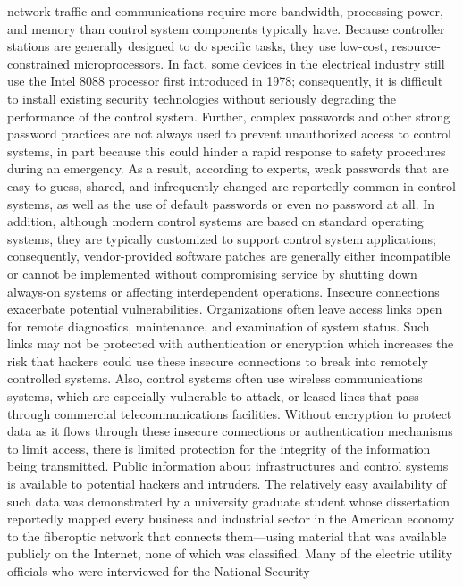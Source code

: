 \documentclass{article}
\begin{document}
network traffic and communications require more bandwidth, processing
power, and memory than control system components typically have. Because
controller stations are generally designed to do specific tasks, they
use low-cost, resource-constrained microprocessors. In fact, some
devices in the electrical industry still use the Intel 8088 processor
first introduced in 1978; consequently, it is difficult to install
existing security technologies without seriously degrading the
performance of the control system. Further, complex passwords and other
strong password practices are not always used to prevent unauthorized
access to control systems, in part because this could hinder a rapid
response to safety procedures during an emergency. As a result,
according to experts, weak passwords that are easy to guess, shared, and
infrequently changed are reportedly common in control systems, as well
as the use of default passwords or even no password at all. In addition,
although modern control systems are based on standard operating systems,
they are typically customized to support control system applications;
consequently, vendor-provided software patches are generally either
incompatible or cannot be implemented without compromising service by
shutting down always-on systems or affecting interdependent operations.
Insecure connections exacerbate potential vulnerabilities. Organizations
often leave access links open for remote diagnostics, maintenance, and
examination of system status. Such links may not be protected with
authentication or encryption which increases the risk that hackers could
use these insecure connections to break into remotely controlled
systems. Also, control systems often use wireless communications
systems, which are especially vulnerable to attack, or leased lines that
pass through commercial telecommunications facilities. Without
encryption to protect data as it flows through these insecure
connections or authentication mechanisms to limit access, there is
limited protection for the integrity of the information being
transmitted. Public information about infrastructures and control
systems is available to potential hackers and intruders. The relatively
easy availability of such data was demonstrated by a university graduate
student whose dissertation reportedly mapped every business and
industrial sector in the American economy to the fiberoptic network that
connects them---using material that was available publicly on the
Internet, none of which was classified. Many of the electric utility
officials who were interviewed for the National Security
\end{document}

